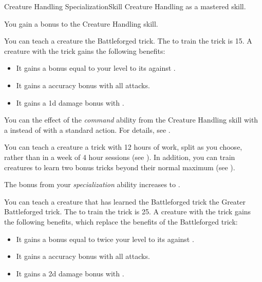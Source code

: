     \begin{feat}{Creature Handling Specialization}{Skill}
        \featpre Creature Handling as a mastered skill.

         You gain a  bonus to the Creature Handling skill.

         You can teach a creature the Battleforged trick.
        The  to train the trick is 15.
        A creature with the trick gains the following benefits:
        \begin{itemize}
            \item It gains a bonus equal to your level to its  against .
            \item It gains a  accuracy bonus with all attacks.
            \item It gains a \plus1d damage bonus with .
        \end{itemize}

         You can  the effect of the \textit{command} ability from the Creature Handling skill with a  instead of with a standard action.
        For details, see .

         You can teach a creature a trick with 12 hours of work, split as you choose, rather than in a week of 4 hour sessions (see ).
        In addition, you can train creatures to learn two bonus tricks beyond their normal maximum (see ).

         The bonus from your \textit{specialization} ability increases to .

         You can teach a creature that has learned the Battleforged trick the Greater Battleforged trick.
        The  to train the trick is 25.
        A creature with the trick gains the following benefits, which replace the benefits of the Battleforged trick:
        \begin{itemize}
            \item It gains a bonus equal to twice your level to its  against .
            \item It gains a  accuracy bonus with all attacks.
            \item It gains a \plus2d damage bonus with .
        \end{itemize}


\end{feat}
